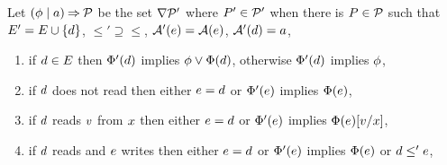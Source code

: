 \begin{candidate}
  \label{cand:ord}
  \label{def:pre-sc}
  \label{def:prefix}
  Let $(\phi \mid a) \mathbin\Rightarrow \mathcal{P}$ be the set
  $\nabla \mathcal{P}'$ %
  where
$P'\in\mathcal{P}'$ when 
there is $P\in\mathcal{P}$ such that
\hbox{{} $E' = E \cup \{d\}$,}
{}  ${\le'}\supseteq{\le}$, %
{}  $\mathcal{A}'(e) = \mathcal{A}(e)$, 
 $\mathcal{A}'(d) = a$,
\begin{enumerate}
\item[{\labeltextsc[P4a]{(P4a)}{4a}}]{}%
  if $d\in E$ then $\Phi'(d)$ implies
  $\phi\lor\Phi(d)$, otherwise $\Phi'(d)$ implies $\phi$,
\item[{\labeltextsc[P4b]{(P4b)}{4b}}]
  if $d$ does not read then either $e=d$ or
  $\Phi'(e)$ implies $\Phi(e)$, 
\item[{\labeltextsc[P4c]{(P4c)}{4c}}]
  if $d$ reads $v$ from $x$ then either $e=d$ or
  $\Phi'(e)$ implies $\Phi(e)[v/x]$,
\item[{\labeltextsc[P5a]{(P5a)}{5a}}]%
  if $d$ reads and $e$ writes then either $e=d$ or $\Phi'(e)$
  implies $\Phi(e)$ or $d\le'e$,

\end{enumerate}
\end{candidate}
